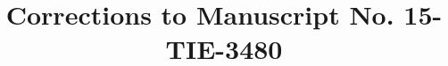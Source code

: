 \documentclass[10pt,journal]{IEEEtran}
\begin{document}
%
\title{Corrections to Manuscript No. 15-TIE-3480}
%
%
%
%
\end{document}
